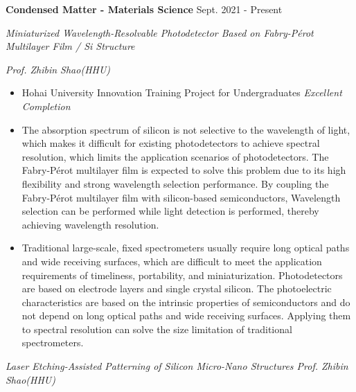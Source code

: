 \documentclass[12pt]{article}
\begin{document}
\medskip \textbf{Condensed Matter - Materials Science} \hfill Sept. 2021 - Present

\quad \textit{Miniaturized Wavelength-Resolvable Photodetector Based on Fabry-P\'{e}rot Multilayer Film / Si Structure}

\hfill \textit{Prof. Zhibin Shao(HHU)}

\begin{itemize}[noitemsep,nolistsep]
    \item Hohai University Innovation Training Project for Undergraduates \textit{Excellent Completion}
    \item The absorption spectrum of silicon is not selective to the wavelength of light, which makes it difficult for existing photodetectors to achieve spectral resolution, which limits the application scenarios of photodetectors. The Fabry-P\'{e}rot multilayer film is expected to solve this problem due to its high flexibility and strong wavelength selection performance. By coupling the Fabry-P\'{e}rot multilayer film with silicon-based semiconductors, Wavelength selection can be performed while light detection is performed, thereby achieving wavelength resolution.
    \item Traditional large-scale, fixed spectrometers usually require long optical paths and wide receiving surfaces, which are difficult to meet the application requirements of timeliness, portability, and miniaturization. Photodetectors are based on electrode layers and single crystal silicon. The photoelectric characteristics are based on the intrinsic properties of semiconductors and do not depend on long optical paths and wide receiving surfaces. Applying them to spectral resolution can solve the size limitation of traditional spectrometers.
\end{itemize}

\quad \textit{Laser Etching-Assisted Patterning of Silicon Micro-Nano Structures \hfill Prof. Zhibin Shao(HHU)}
\end{document}
